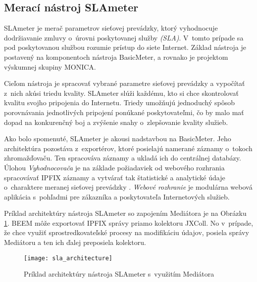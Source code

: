 \subsection{Merací nástroj SLAmeter}

SLAmeter je merač parametrov sieťovej prevádzky, ktorý vyhodnocuje dodržiavanie zmluvy o~úrovni poskytovanej 
služby \emph{(SLA)}. V~tomto prípade sa pod poskytovanou službou rozumie prístup do siete 
Internet. Základ nástroja je postavený na komponentoch nástroja BasicMeter, a rovnako je projektom 
výskumnej skupiny MONICA. 

Cieľom nástroja je spracovať vybrané parametre sieťovej prevádzky a vypočítať z~nich akúsi triedu 
kvality. SLAmeter slúži každému, kto si chce skontrolovať kvalitu svojho pripojenia do Internetu. 
Triedy umožňujú jednoduchý spôsob porovnávania jednotlivých pripojení ponúkané poskytovateľmi, 
čo by malo mať dopad na konkurenčný boj a zvýšenie snahy o~zlepšovanie kvality služieb. \citep{slameter}

Ako bolo spomenuté, SLAmeter je akousi nadstavbou na BasicMeter. Jeho architektúra pozostáva z~exportérov,
ktoré posielajú namerané záznamy o~tokoch zhromažďovaču. Ten spracováva záznamy a ukladá ich do 
centrálnej databázy. Úlohou \emph{Vyhodnocovača} je na základe požiadaviek od webového rozhrania 
spracovávať IPFIX záznamy a vytvárať tak štatistické a analytické údaje o~charaktere 
meranej sieťovej prevádzky \citep{evaluator}. \emph{Webové rozhranie} je modulárna webová aplikácia 
s~pohľadmi pre zákazníka a poskytovateľa Internetových služieb.

Príklad architektúry nástroja SLAmeter so zapojením Mediátora je na Obrázku \ref{o:sla_architecture}.
BEEM môže exportovať IPFIX správy priamo kolektoru JXColl. No v~prípade, že chce využiť sprostredkovateľské 
procesy na modifikáciu údajov, posiela správy Mediátoru a ten ich ďalej preposiela kolektoru.

\begin{figure}[ht!]
\centering
\texttt{[image: sla\_architecture]}
\caption{Príklad architektúry nástroja SLAmeter s~využitím Mediátora}\label{o:sla_architecture}
\end{figure}